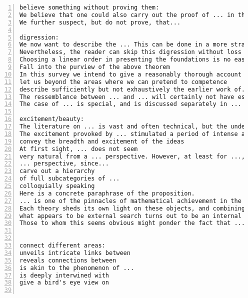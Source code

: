 \documentclass[11pt]{amsart}
\begin{document}
\begin{lstlisting}[numbers=left,numberstyle=\tiny,numbersep=10pt]
believe something without proving them:
We believe that one could also carry out the proof of ... in the language of ..., but we  have not investigated the details.
We further suspect, but do not prove, that...

digression:
We now want to describe the ... This can be done in a more straightforward way, but we prefer to include a short digression in ... theory as this allows us to mention a general fact which is in the background of a later construction anyhow.
Nevertheless, the reader can skip this digression without loss of continuity and continue with ... instead.
Choosing a linear order in presenting the foundations is no easy task.
Fall into the purview of the above theorem
In this survey we intend to give a reasonably thorough account of the recent work, though mostly without detailed proofs
let us beyond the areas where we can pretend to competence
describe sufficiently but not exhaustively the earlier work of...
The ressemblance between ... and ... will certainly not have escaped the reader's sagacity.
The case of ... is special, and is discussed separately in ...

excitement/beauty:
The literature on ... is vast and often technical, but the underlying ideas are possessing of an undeniable beauty.
The excitement provoked by ... stimulated a period of intense and widespread activity.
convey the breadth and excitement of the ideas
At first sight, ... does not seem
very natural from a ... perspective. However, at least for ..., ... is important from
... perspective, since...
carve out a hierarchy
of full subcategories of ...
colloquially speaking
Here is a concrete paraphrase of the proposition.
... is one of the pinnacles of mathematical achievement in the 20th century.
Each theory sheds its own light on these objects, and combining the various perspectives is likely to be very fruitful.
what appears to be external search turns out to be an internal search
Those to whom this seems obvious might ponder the fact that ...


connect different areas:
unveils intricate links between
reveals connections between
is akin to the phenomenon of ...
is deeply interwined with
give a bird's eye view on


\end{lstlisting}
\end{document}
